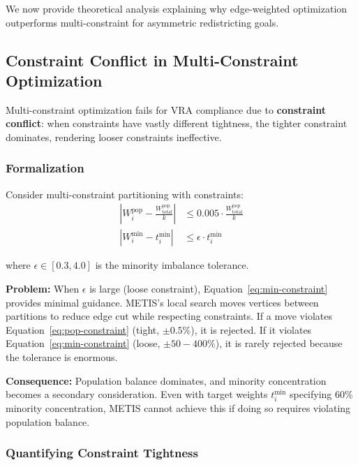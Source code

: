 \label{sec:theory}

We now provide theoretical analysis explaining why edge-weighted optimization outperforms multi-constraint for asymmetric redistricting goals.

\subsection{Constraint Conflict in Multi-Constraint Optimization}

Multi-constraint optimization fails for VRA compliance due to \textbf{constraint conflict}: when constraints have vastly different tightness, the tighter constraint dominates, rendering looser constraints ineffective.

\subsubsection{Formalization}

Consider multi-constraint partitioning with constraints:
\begin{align}
\left| W_i^{\text{pop}} - \frac{W_{\text{total}}^{\text{pop}}}{k} \right| &\leq 0.005 \cdot \frac{W_{\text{total}}^{\text{pop}}}{k} \label{eq:pop-constraint} \\
\left| W_i^{\text{min}} - t_i^{\text{min}} \right| &\leq \epsilon \cdot t_i^{\text{min}} \label{eq:min-constraint}
\end{align}

where $\epsilon \in [0.3, 4.0]$ is the minority imbalance tolerance.

\textbf{Problem:} When $\epsilon$ is large (loose constraint), Equation~\ref{eq:min-constraint} provides minimal guidance. METIS's local search moves vertices between partitions to reduce edge cut while respecting constraints. If a move violates Equation~\ref{eq:pop-constraint} (tight, $\pm0.5\%$), it is rejected. If it violates Equation~\ref{eq:min-constraint} (loose, $\pm50-400\%$), it is rarely rejected because the tolerance is enormous.

\textbf{Consequence:} Population balance dominates, and minority concentration becomes a secondary consideration. Even with target weights $t_i^{\text{min}}$ specifying 60\% minority concentration, METIS cannot achieve this if doing so requires violating population balance.

\subsubsection{Quantifying Constraint Tightness}


